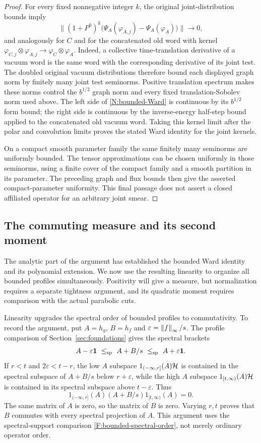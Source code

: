 \begin{proof}
For every fixed nonnegative integer $k$, the original joint-distribution
bounds imply
\[
 \bigl\|(1+P^0)^k\bigl(\Psi_A(\varphi_{A,j})-\Psi_A(\varphi_A)\bigr)\bigr\|
 \longrightarrow0,
\]
and analogously for $C$ and for the concatenated old word with kernel
$\varphi_{C,j}\otimes\varphi_{A,j}\to\varphi_C\otimes\varphi_A$. Indeed, a collective
time-translation derivative of a vacuum word is the same word with the
corresponding derivative of its joint test. The doubled original vacuum
distributions therefore bound each displayed graph norm by finitely many
joint test seminorms. Positive translation spectrum makes these norms
control the $b^{1/2}$ graph norm and every fixed translation-Sobolev norm
used above. The left side of \eqref{N:bounded-Ward} is continuous by its
$b^{1/2}$ form bound; the right side is continuous by the inverse-energy
half-step bound applied to the concatenated old vacuum word. Taking this
kernel limit after the polar and convolution limits proves the stated Ward
identity for the joint kernels.

On a compact smooth parameter family the same finitely many seminorms are
uniformly bounded. The tensor approximations can be chosen uniformly in
those seminorms, using a finite cover of the compact family and a smooth
partition in its parameter. The preceding graph and flux bounds then give
the asserted compact-parameter uniformity. This final passage does not
assert a closed affiliated operator for an arbitrary joint smear.
\end{proof}

\subsection{The commuting measure and its second moment}

The analytic part of the argument has established the bounded Ward
identity and its polynomial extension. We now use the resulting
linearity to organize all bounded profiles simultaneously. Positivity
will give a measure, but normalization requires a separate tightness
argument, and its quadratic moment requires comparison with the
actual parabolic cuts.

Linearity upgrades the spectral order of bounded profiles to
commutativity.  To record the argument, put $A=h_g$, $B=h_f$ and
$\varepsilon=\left\lVert f\right\rVert_\infty/s$.  The profile comparison of
Section~\ref{sec:foundations} gives the spectral brackets
\[
 A-\varepsilon\id\ \leq_{\rm sp}\ A+B/s
       \ \leq_{\rm sp}\ A+\varepsilon\id.
\]
If $r<t$ and $2\varepsilon<t-r$, the low $A$ subspace
$1_{(-\infty,r]}(A)\mathcal H$ is contained in the spectral subspace of
$A+B/s$ below $r+\varepsilon$, while the high $A$ subspace
$1_{[t,\infty)}(A)\mathcal H$ is contained in its spectral subspace above
$t-\varepsilon$.  Thus
\[
 1_{(-\infty,r]}(A)(A+B/s)1_{[t,\infty)}(A)=0.
\]
The same matrix of $A$ is zero, so the matrix of $B$ is zero.
Varying $r,t$ proves that $B$ commutes with every spectral projection
of $A$.  This argument uses the spectral-support comparison
\eqref{F:bounded-spectral-order}, not merely ordinary operator order.


